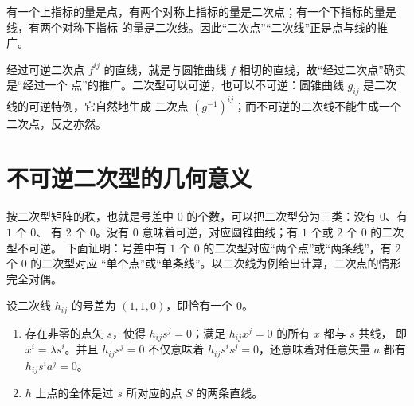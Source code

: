 有一个上指标的量是点，有两个对称上指标的量是二次点；有一个下指标的量是线，有两个对称下指标
的量是二次线。因此“二次点”“二次线”正是点与线的推广。

\begin{remark}
经过可逆二次点 $f^{ij}$ 的直线，就是与圆锥曲线 $f$ 相切的直线，故“经过二次点”确实是“经过一个
点”的推广。二次型可以可逆，也可以不可逆：圆锥曲线 $g_{ij}$ 是二次线的可逆特例，它自然地生成
二次点 $(g^{-1})^{ij}$；而不可逆的二次线不能生成一个二次点，反之亦然。
\end{remark}

\section{不可逆二次型的几何意义}

按二次型矩阵的秩，也就是号差中 $0$ 的个数，可以把二次型分为三类：没有 $0$、有 $1$ 个 $0$、
有 $2$ 个 $0$。没有 $0$ 意味着可逆，对应圆锥曲线；有 $1$ 个或 $2$ 个 $0$ 的二次型不可逆。
下面证明：号差中有 $1$ 个 $0$ 的二次型对应“两个点”或“两条线”，有 $2$ 个 $0$ 的二次型对应
“单个点”或“单条线”。以二次线为例给出计算，二次点的情形完全对偶。

\begin{proposition}
\label{prop:onezero}
设二次线 $h_{ij}$ 的号差为 $(1,1,0)$，即恰有一个 $0$。
\begin{enumerate}[label=(\arabic*),leftmargin=2.4em]
\item 存在非零的点矢 $s$，使得 $h_{ij}s^j=0$；满足 $h_{ij}x^j=0$ 的所有 $x$ 都与 $s$ 共线，
即 $x^i=\lambda s^i$。并且 $h_{ij}s^j=0$ 不仅意味着 $h_{ij}s^is^j=0$，还意味着对任意矢量 $a$
都有 $h_{ij}s^ia^j=0$。
\item $h$ 上点的全体是过 $s$ 所对应的点 $S$ 的两条直线。
\end{enumerate}
\end{proposition}

